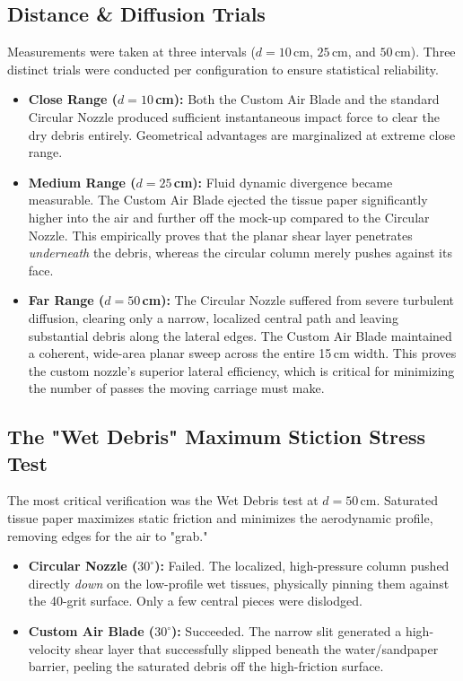 \documentclass{article}
\begin{document}
\subsection{Distance \& Diffusion Trials}
Measurements were taken at three intervals ($d = 10\,$cm, $25\,$cm, and $50\,$cm). Three distinct trials were conducted per configuration to ensure statistical reliability. 
\begin{itemize}
    \item \textbf{Close Range ($d = 10\,$cm):} Both the Custom Air Blade and the standard Circular Nozzle produced sufficient instantaneous impact force to clear the dry debris entirely. Geometrical advantages are marginalized at extreme close range.
    \item \textbf{Medium Range ($d = 25\,$cm):} Fluid dynamic divergence became measurable. The Custom Air Blade ejected the tissue paper significantly higher into the air and further off the mock-up compared to the Circular Nozzle. This empirically proves that the planar shear layer penetrates \textit{underneath} the debris, whereas the circular column merely pushes against its face.
    \item \textbf{Far Range ($d = 50\,$cm):} The Circular Nozzle suffered from severe turbulent diffusion, clearing only a narrow, localized central path and leaving substantial debris along the lateral edges. The Custom Air Blade maintained a coherent, wide-area planar sweep across the entire 15\,cm width. This proves the custom nozzle's superior lateral efficiency, which is critical for minimizing the number of passes the moving carriage must make.
\end{itemize}

\subsection{The "Wet Debris" Maximum Stiction Stress Test}
The most critical verification was the Wet Debris test at $d = 50\,$cm. Saturated tissue paper maximizes static friction and minimizes the aerodynamic profile, removing edges for the air to "grab."
\begin{itemize}
    \item \textbf{Circular Nozzle ($30^\circ$):} Failed. The localized, high-pressure column pushed directly \textit{down} on the low-profile wet tissues, physically pinning them against the 40-grit surface. Only a few central pieces were dislodged.
    \item \textbf{Custom Air Blade ($30^\circ$):} Succeeded. The narrow slit generated a high-velocity shear layer that successfully slipped beneath the water/sandpaper barrier, peeling the saturated debris off the high-friction surface.
\end{itemize}
\end{document}
